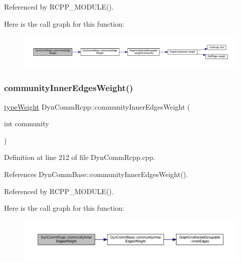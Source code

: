 Referenced by R\+C\+P\+P\+\_\+\+M\+O\+D\+U\+L\+E().

Here is the call graph for this function\+:
\nopagebreak
\begin{figure}[H]
\begin{center}
\leavevmode
\includegraphics[width=350pt]{classDynCommRcpp_ad74a2abe244e62d9df2b98aeea0d3155_cgraph}
\end{center}
\end{figure}
\mbox{\label{classDynCommRcpp_aed6b4f1e844956429eb9a15d8d6df7b6}} 
\subsubsection{\texorpdfstring{community\+Inner\+Edges\+Weight()}{communityInnerEdgesWeight()}}
{\footnotesize\ttfamily \hyperlink{edge_8h_a2e7ea3be891ac8b52f749ec73fee6dd2}{type\+Weight} Dyn\+Comm\+Rcpp\+::community\+Inner\+Edges\+Weight (\begin{DoxyParamCaption}\item[{int}]{community }\end{DoxyParamCaption})\hspace{0.3cm}{\ttfamily [inline]}}



Definition at line 212 of file Dyn\+Comm\+Rcpp.\+cpp.



References Dyn\+Comm\+Base\+::community\+Inner\+Edges\+Weight().



Referenced by R\+C\+P\+P\+\_\+\+M\+O\+D\+U\+L\+E().

Here is the call graph for this function\+:
\nopagebreak
\begin{figure}[H]
\begin{center}
\leavevmode
\includegraphics[width=350pt]{classDynCommRcpp_aed6b4f1e844956429eb9a15d8d6df7b6_cgraph}
\end{center}
\end{figure}
\mbox{\label{classDynCommRcpp_a132aff4ca6f76fd006b2faccbfd01e04}} 
